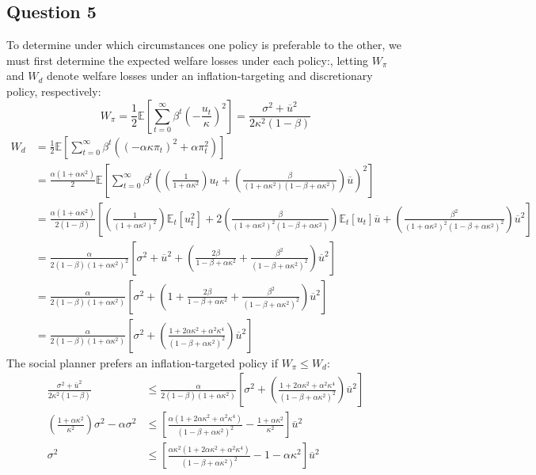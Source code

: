 \documentclass{article}
\newcommand{\E}[1]{\mathbb{E}\left[#1\right]} %
\newcommand{\Et}[1]{\mathbb{E}_t\left[#1\right]}
\begin{document}

\subsection*{Question 5}
To determine under which circumstances one policy is preferable to the other, we must first determine the expected welfare losses under each policy:, letting $W_\pi$ and $W_d$ denote welfare losses under an inflation-targeting and discretionary policy, respectively:
\[
	W_\pi 	= \frac{1}{2}\E{\sum_{t=0}^\infty\beta^t\left(-\frac{u_t}{\kappa}\right)^2}
			= \frac{\sigma^2+\overline{u}^2}{2\kappa^2(1-\beta)}
\]
{\footnotesize \begin{align*}
	W_d		&= \frac{1}{2}\E{\sum_{t=0}^\infty\beta^t\left((-\alpha\kappa\pi_t)^2 + \alpha\pi_t^2\right)}	\\
			&= \frac{\alpha(1+\alpha\kappa^2)}{2}\E{\sum_{t=0}^\infty\beta^t
					\left(\left(\frac{1}{1 + \alpha\kappa^2}\right)u_t + \left(\frac{\beta}{(1 + \alpha\kappa^2)(1 -\beta + \alpha\kappa^2)}\right)\overline{u}\right)^2
				}		\\
			&= \frac{\alpha(1+\alpha\kappa^2)}{2(1-\beta)}\left[
					\left(\frac{1}{(1 + \alpha\kappa^2)^2}\right)\Et{u_t^2} + 
					2\left(\frac{\beta}{(1 + \alpha\kappa^2)^2(1 -\beta + \alpha\kappa^2)}\right)\Et{u_t}\overline{u} +
					\left(\frac{\beta^2}{(1 + \alpha\kappa^2)^2(1 -\beta + \alpha\kappa^2)^2}\right)\overline{u}^2
				\right]		\\
			&= \frac{\alpha}{2(1-\beta)(1 + \alpha\kappa^2)^2}\left[
					\sigma^2+\overline{u}^2 + 
					\left(\frac{2\beta}{1 -\beta + \alpha\kappa^2} + \frac{\beta^2}{(1 -\beta + \alpha\kappa^2)^2}\right)\overline{u}^2
				\right]		\\
			&= \frac{\alpha}{2(1-\beta)(1+\alpha\kappa^2)}\left[
					\sigma^2 + \left(
							1 + \frac{2\beta}{1 -\beta + \alpha\kappa^2} 
							+ \frac{\beta^2}{(1 -\beta + \alpha\kappa^2)^2}
							\right)\overline{u}^2
				\right]		\\
			&= \frac{\alpha}{2(1-\beta)(1+\alpha\kappa^2)}\left[
					\sigma^2 + \left(
							\frac{1+2\alpha\kappa^2 + \alpha^2\kappa^4}{(1 -\beta + \alpha\kappa^2)^2}
							\right)\overline{u}^2
				\right]	
\end{align*} }
The social planner prefers an inflation-targeted policy if $W_\pi\leq W_d$:
\begin{align*}
	\frac{\sigma^2+\overline{u}^2}{2\kappa^2(1-\beta)}	&\leq 
		\frac{\alpha}{2(1-\beta)(1+\alpha\kappa^2)}\left[
					\sigma^2 + \left(
							\frac{1+2\alpha\kappa^2 + \alpha^2\kappa^4}{(1 -\beta + \alpha\kappa^2)^2}
							\right)\overline{u}^2 \right]	\\
	\left(\frac{1+\alpha\kappa^2}{\kappa^2}\right)\sigma^2-\alpha\sigma^2 &\leq	
		\left[\frac{\alpha(1+2\alpha\kappa^2 + \alpha^2\kappa^4)}{(1 -\beta + \alpha\kappa^2)^2} - \frac{1+\alpha\kappa^2}{\kappa^2}\right]\overline{u}^2	\\
	\sigma^2 &\leq \left[\frac{\alpha\kappa^2(1+2\alpha\kappa^2 + \alpha^2\kappa^4)}{(1 -\beta + \alpha\kappa^2)^2} - 1-\alpha\kappa^2\right]\overline{u}^2
\end{align*}
\end{document}
